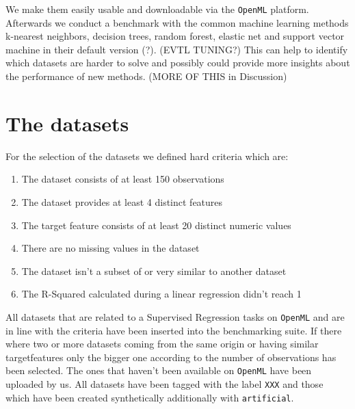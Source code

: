 \documentclass[a4paper]{article}
\begin{document}
We make them easily usable and downloadable via the \texttt{OpenML} platform.  
Afterwards we conduct a benchmark with the common machine learning methods k-nearest neighbors, decision trees, random forest, elastic net and support vector machine in their default version (?). (EVTL TUNING?) 
This can help to identify which datasets are harder to solve and possibly could provide more insights about the performance of new methods. (MORE OF THIS in Discussion)

  

\section{The datasets}

For the selection of the datasets we defined hard criteria which are: 
\begin{enumerate}
	\item The dataset consists of at least 150 observations 
	\item The dataset provides at least 4 distinct features 
	\item The target feature consists of at least 20 distinct numeric values 
	\item There are no missing values in the dataset 
	\item The dataset isn't a subset of or very similar to another dataset 
	\item The R-Squared calculated during a linear regression didn't reach 1
\end{enumerate}
All datasets that are related to a Supervised Regression tasks on \texttt{OpenML} and are in line with the criteria have been inserted into the benchmarking suite. If there where two or more datasets coming from the same origin or having similar targetfeatures only the bigger one according to the number of observations has been selected. The ones that haven't been available on \texttt{OpenML} have been uploaded by us. All datasets have been tagged with the label \texttt{XXX} and those which have been created synthetically additionally with \texttt{artificial}.
\end{document}
